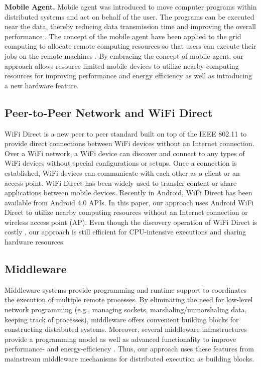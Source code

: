 \documentclass{sig-alternate}
\begin{document}
\textbf{Mobile Agent.} Mobile agent was introduced to move computer programs within distributed systems and act on behalf of the user. The programs can be executed near the data, thereby reducing data transmission time and improving the overall performance \cite{peine+:ma99}. The concept of the mobile agent have been applied to the grid computing to allocate remote computing resources so that users can execute their jobs on the remote machines \cite{fukuda+:ma_grid03}. By embracing the concept of mobile agent, our approach allows resource-limited mobile devices to utilize nearby computing resources for improving performance and energy efficiency as well as introducing a new hardware feature.

\subsection{Peer-to-Peer Network and WiFi Direct}
WiFi Direct \cite{alliance2010wi} is a new peer to peer standard built on top of the IEEE 802.11 to provide direct connections between WiFi devices without an Internet connection. Over a WiFi network, a WiFi device can discover and connect to any types of WiFi devices without special configurations or setups. Once a connection is established, WiFi devices can communicate with each other as a client or an access point. WiFi Direct has been widely used to transfer content or share applications between mobile devices. Recently in Android, WiFi Direct has been available from Android 4.0 APIs. In this paper, our approach uses Android WiFi Direct \cite{wifi:p2p} to utilize nearby computing resources without an Internet connection or wireless access point (AP). Even though the discovery operation of WiFi Direct is costly \cite{trifunovic2013slicing}, our approach is still efficient for CPU-intensive executions and sharing hardware resources. 

\subsection{Middleware}
Middleware systems provide programming and runtime support to coordinates the execution of multiple remote processes. By eliminating the need for low-level network programming (e.g., managing sockets, marshaling/unmarshaling data, keeping track of processes), middleware offers convenient building blocks for constructing distributed systems. Moreover, several middleware infrastructures provide a programming model as well as advanced functionality to improve performance- and energy-efficiency \cite{kwon+:mobilesoft2015}. Thus, our approach uses these features from mainstream middleware mechanisms for distributed execution as building blocks. 
\end{document}
